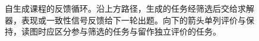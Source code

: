 \begin{figure}[htbp]
\centering

\caption{自生成课程的反馈循环。沿上方路径，生成的任务经筛选后交给求解器，表现或一致性信号反馈给下一轮出题。向下的箭头单列评价与保持，读图时应区分参与筛选的任务与留作独立评价的任务。}
\label{fig:ch11-loop}
\end{figure}
